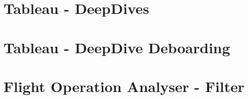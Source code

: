 \begin{appendices}
\section{Tableau - DeepDives}
\label{appendix:tableau_deepdives}

\begin{figure}[h]
\end{figure}
\newpage




\section{Tableau - DeepDive Deboarding}
\label{appendix:tableau_deepdive_deboarding}

\begin{figure}[h]
\end{figure}
\newpage


\section{Flight Operation Analyser - Filter}
\label{appendix:foa_filter}


\end{appendices}
